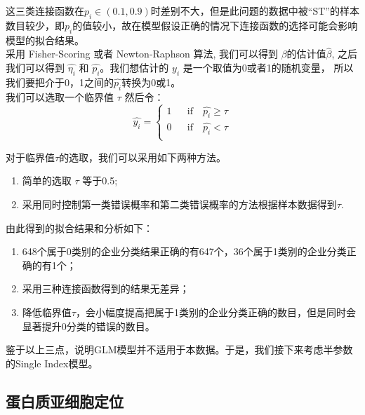 \documentclass[a4paper,UTF8]{article}
\begin{document}
这三类连接函数在$p_{i}\in (0.1,0.9)$时差别不大，但是此问题的数据中被“ST”的样本数目较少，即$p_{i}$的值较小，故在模型假设正确的情况下连接函数的选择可能会影响模型的拟合结果。\\

采用 Fisher-Scoring 或者 Newton-Raphson 算法, 我们可以得到 $\beta$的估计值$\hat{\beta}$, 之后我们可以得到 $\hat{\eta_{i}}$ 和 $\hat{p_{i}}$。我们想估计的 $y_{i}$ 是一个取值为0或者1的随机变量， 所以我们要把介于0，1之间的$\hat{p_{i}}$转换为0或1。\\

我们可以选取一个临界值 $\tau $ 然后令：
$$ \hat{y_{i}} = \left\{
\begin{array}{rcl}
1     &      & {\text{if} \quad \hat{p_{i}} \geq \tau}\\
0     &      & {\text{if} \quad \hat{p_{i}}<\tau}\\
\end{array} \right. $$

对于临界值$\tau $的选取，我们可以采用如下两种方法。
\begin{enumerate}[1.]
	\item 简单的选取 $\tau$ 等于0.5;
	\item 采用同时控制第一类错误概率和第二类错误概率的方法根据样本数据得到$\tau$.
\end{enumerate}

由此得到的拟合结果和分析如下：
\begin{enumerate}[(1)]
	\item 648个属于0类别的企业分类结果正确的有647个，36个属于1类别的企业分类正确的有1个；
	\item 采用三种连接函数得到的结果无差异；
	\item 降低临界值$\tau$，会小幅度提高把属于1类别的企业分类正确的数目，但是同时会显著提升0分类的错误的数目。
\end{enumerate}

鉴于以上三点，说明GLM模型并不适用于本数据。于是，我们接下来考虑半参数的Single Index模型。

\subsection{蛋白质亚细胞定位}
\end{document}
